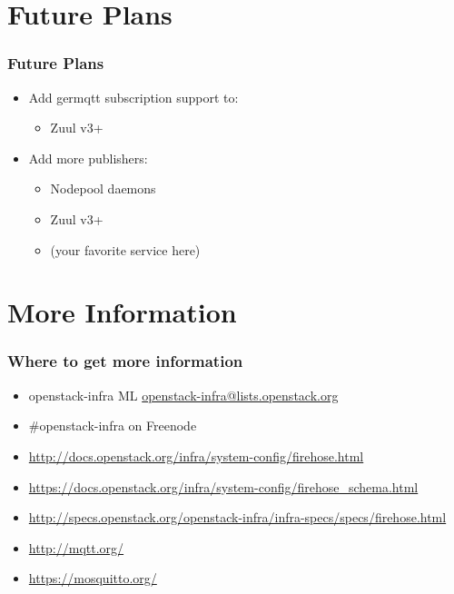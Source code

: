 \documentclass[aspectratio=169,11pt,hyperref={colorlinks=true}]{beamer}
\begin{document}
\section{Future Plans}
\begin{frame}
    \frametitle{Future Plans}
    \begin{itemize}
        \item Add germqtt subscription support to:
            \begin{itemize}
                \item Zuul v3+
            \end{itemize}
        \item Add more publishers:
            \begin{itemize}
                \item Nodepool daemons
                \item Zuul v3+
                \item (your favorite service here)
            \end{itemize}
    \end{itemize}
\end{frame}

\section{More Information}
\begin{frame}
\frametitle{Where to get more information}
    \begin{itemize}
        \item openstack-infra ML\: \href{mailto:openstack-infra@lists.openstack.org}{openstack-infra@lists.openstack.org}
        \item \#openstack-infra on Freenode
	\item \href{http://docs.openstack.org/infra/system-config/firehose.html}{http://docs.openstack.org/infra/system-config/firehose.html}
    \item \href{https://docs.openstack.org/infra/system-config/firehose_schema.html}{https://docs.openstack.org/infra/system-config/firehose\_schema.html}
	\item \href{http://specs.openstack.org/openstack-infra/infra-specs/specs/firehose.html}{http://specs.openstack.org/openstack-infra/infra-specs/specs/firehose.html}
	\item \href{http://mqtt.org/}{http://mqtt.org/}
	\item \href{https://mosquitto.org/}{https://mosquitto.org/}
    \end{itemize}
\end{frame}
\end{document}
